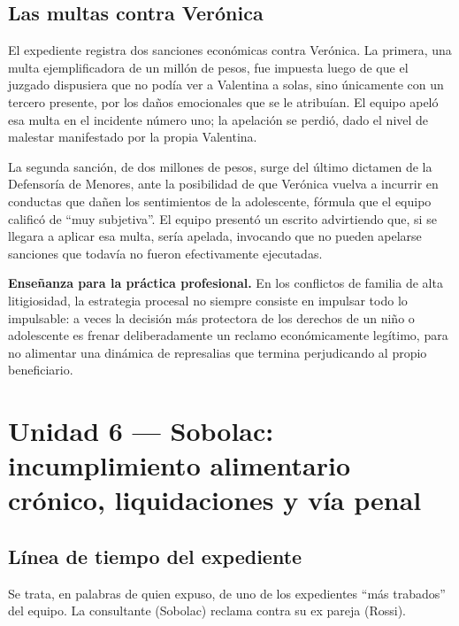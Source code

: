 \documentclass[12pt,oneside]{book}
\begin{document}
\subsection{Las multas contra Verónica}

El expediente registra dos sanciones económicas contra Verónica. La primera, una multa ejemplificadora de un millón de pesos, fue impuesta luego de que el juzgado dispusiera que no podía ver a Valentina a solas, sino únicamente con un tercero presente, por los daños emocionales que se le atribuían. El equipo apeló esa multa en el incidente número uno; la apelación se perdió, dado el nivel de malestar manifestado por la propia Valentina.

La segunda sanción, de dos millones de pesos, surge del último dictamen de la Defensoría de Menores, ante la posibilidad de que Verónica vuelva a incurrir en conductas que dañen los sentimientos de la adolescente, fórmula que el equipo calificó de ``muy subjetiva''. El equipo presentó un escrito advirtiendo que, si se llegara a aplicar esa multa, sería apelada, invocando que no pueden apelarse sanciones que todavía no fueron efectivamente ejecutadas.

\begin{note}
\textbf{Enseñanza para la práctica profesional.} En los conflictos de familia de alta litigiosidad, la estrategia procesal no siempre consiste en impulsar todo lo impulsable: a veces la decisión más protectora de los derechos de un niño o adolescente es frenar deliberadamente un reclamo económicamente legítimo, para no alimentar una dinámica de represalias que termina perjudicando al propio beneficiario.
\end{note}

\section{Unidad 6 --- Sobolac: incumplimiento alimentario crónico, liquidaciones y vía penal}

\subsection{Línea de tiempo del expediente}

Se trata, en palabras de quien expuso, de uno de los expedientes ``más trabados'' del equipo. La consultante (Sobolac) reclama contra su ex pareja (Rossi).
\end{document}
